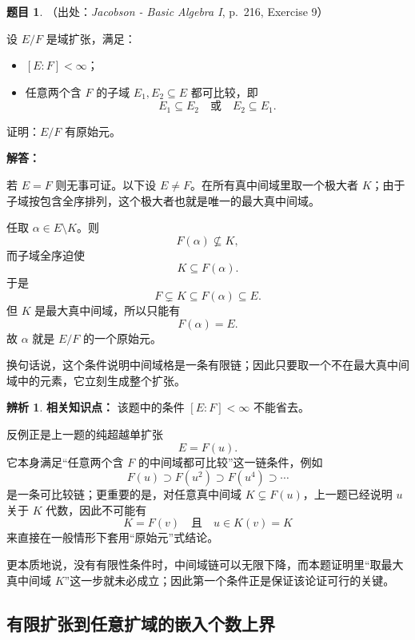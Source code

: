 \documentclass[a4paper]{ctexart}
\theoremstyle{definition}
\newtheorem{example}{题目}[section]
\theoremstyle{analysis}
\newtheorem{remark}{辨析}[section]
\theoremstyle{plain}
\begin{document}
\begin{example}
（出处：\textit{Jacobson - Basic Algebra I}, p.~216, Exercise 9）

设 \(E/F\) 是域扩张，满足：
\begin{itemize}
  \item \([E:F]<\infty\)；
  \item 任意两个含 \(F\) 的子域 \(E_1,E_2\subseteq E\) 都可比较，即
  \[
    E_1\subseteq E_2
    \quad\text{或}\quad
    E_2\subseteq E_1.
  \]
\end{itemize}
证明：\(E/F\) 有原始元。

\textbf{解答：}

若 \(E=F\) 则无事可证。以下设 \(E\neq F\)。在所有真中间域里取一个极大者 \(K\)；由于子域按包含全序排列，这个极大者也就是唯一的最大真中间域。

任取 \(\alpha\in E\setminus K\)。则
\[
  F(\alpha)\not\subseteq K,
\]
而子域全序迫使
\[
  K\subseteq F(\alpha).
\]
于是
\[
  F\subsetneq K\subseteq F(\alpha)\subseteq E.
\]
但 \(K\) 是最大真中间域，所以只能有
\[
  F(\alpha)=E.
\]
故 \(\alpha\) 就是 \(E/F\) 的一个原始元。

换句话说，这个条件说明中间域格是一条有限链；因此只要取一个不在最大真中间域中的元素，它立刻生成整个扩张。
\end{example}

\begin{remark}
\textbf{相关知识点：} 该题中的条件 \([E:F]<\infty\) 不能省去。

反例正是上一题的纯超越单扩张
\[
  E=F(u).
\]
它本身满足“任意两个含 \(F\) 的中间域都可比较”这一链条件，例如
\[
  F(u)\supset F(u^2)\supset F(u^4)\supset \cdots
\]
是一条可比较链；更重要的是，对任意真中间域 \(K\subsetneq F(u)\)，上一题已经说明 \(u\) 关于 \(K\) 代数，因此不可能有
\[
  K=F(v)\quad\text{且}\quad u\in K(v)=K
\]
来直接在一般情形下套用“原始元”式结论。

更本质地说，没有有限性条件时，中间域链可以无限下降，而本题证明里“取最大真中间域 \(K\)”这一步就未必成立；因此第一个条件正是保证该论证可行的关键。
\end{remark}

\subsection{有限扩张到任意扩域的嵌入个数上界}\label{subsec:problem-finite-extension-monomorphism-count}
\end{document}
